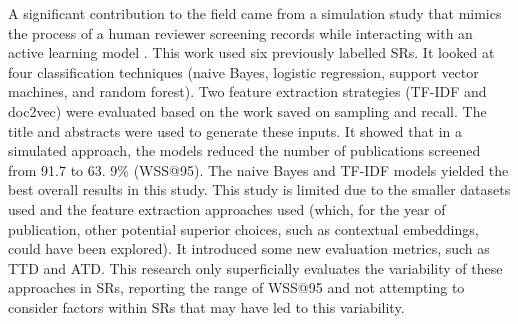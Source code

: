\documentclass[10pt, english]{article}
\begin{document}
A significant contribution to the field came from a simulation study that mimics the process of a human reviewer screening records while interacting with an active learning model \cite{ferdinands_performance_2023}. This work used six previously labelled SRs. It looked at four classification techniques (naive Bayes, logistic regression, support vector machines, and random forest). Two feature extraction strategies (TF-IDF and doc2vec) were evaluated based on the work saved on sampling and recall. The title and abstracts were used to generate these inputs. It showed that in a simulated approach, the models reduced the number of publications screened from 91.7 to 63. 9\% (WSS@95). The naive Bayes and TF-IDF models yielded the best overall results in this study. This study is limited due to the smaller datasets used and the feature extraction approaches used (which, for the year of publication, other potential superior choices, such as contextual embeddings, could have been explored). It introduced some new evaluation metrics, such as TTD and ATD. This research only superficially evaluates the variability of these approaches in SRs, reporting the range of WSS@95 and not attempting to consider factors within SRs that may have led to this variability. 
\end{document}
